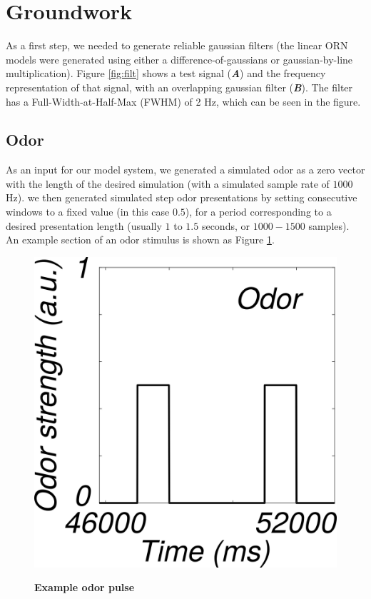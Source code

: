 \documentclass[a4paper,12pt,twoside]{article}
\begin{document}
\section{Groundwork}
As a first step, we needed to generate reliable gaussian filters (the linear ORN models were generated using either a difference-of-gaussians or gaussian-by-line multiplication).  Figure \ref{fig:filt} shows a test signal (\textit{\textbf{A}}) and the frequency representation of that signal, with an overlapping gaussian filter (\textit{\textbf{B}}).  The filter has a Full-Width-at-Half-Max (FWHM) of 2 Hz, which can be seen in the figure.  

\subsection{Odor}
As an input for our model system, we generated a simulated odor as a zero vector with the length of the desired simulation (with a simulated sample rate of $1000$ Hz).  we then generated simulated step odor presentations by setting consecutive windows to a fixed value (in this case $0.5$), for a period corresponding to a desired presentation length (usually $1$ to $1.5$ seconds, or $1000-1500$ samples).  An example section of an odor stimulus is shown as Figure \ref{fig:odor}.

\begin{figure}
\centering
\caption{\textbf{Example odor pulse} \newline}
\hspace*{-1cm}
\includegraphics[scale=0.7]{2016-08-26_Example_Odor.png}
\label{fig:odor}
\end{figure}
\end{document}
